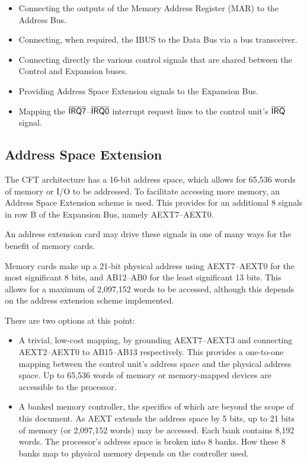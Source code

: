 \documentclass[11pt,a4paper,twocolumns]{article}
\newcommand{\ns}[1]{$\overline{\mbox{\textsf{{#1}}}}$}
\newcommand{\ps}[1]{\textsf{#1}}
\newcommand\bus[1]{{#1}}
\newcommand\IBUS{\bus{IBUS}}
\newcommand\register[1]{\textsf{#1}}
\newcommand\MAR{\register{MAR}}
\newcommand\IRQ{\ns{IRQ}}
\newcommand\IRQn[1]{\ns{IRQ{#1}}}
\newcommand\ABUSn[1]{\ps{AB#1}}
\newcommand\AEXTn[1]{\ps{AEXT#1}}
\begin{document}
\begin{itemize}
\item Connecting the outputs of the Memory Address Register (\MAR) to the Address Bus.
\item Connecting, when required, the \IBUS{} to the Data Bus via a bus transceiver.
\item Connecting directly the various control signals that are shared
  between the Control and Expansion buses.
\item Providing Address Space Extension signals to the Expansion Bus.
\item Mapping the \IRQn{7}–\IRQn{0} interrupt request lines to the
  control unit's \IRQ{} signal.
\end{itemize}

\subsection{Address Space Extension}

The CFT architecture has a 16-bit address space, which allows for
65,536 words of memory or I/O to be addressed. To facilitate accessing
more memory, an Address Space Extension scheme is used. This provides
for an additional 8 signals in row B of the Expansion Bus, namely
\AEXTn{7}–\AEXTn{0}.

An address extension card may drive these signals in one of many ways
for the benefit of memory cards.

Memory cards make up a 21-bit physical address using
\AEXTn{7}–\AEXTn{0} for the most significant 8 bits, and
\ABUSn{12}–\ABUSn{0} for the least significant 13 bits. This allows
for a maximum of 2,097,152 words to be accessed, although this depends
on the address extension scheme implemented.

There are two options at this point:

\begin{itemize}
\item A trivial, low-cost mapping, by grounding \AEXTn{7}–\AEXTn{3}
  and connecting \AEXTn{2}–\AEXTn{0} to \ABUSn{15}–\ABUSn{13}
  respectively. This provides a one-to-one mapping between the control
  unit's address space and the physical address space. Up to 65,536
  words of memory or memory-mapped devices are accessible to the
  processor.
\item A banked memory controller, the specifics of which are beyond
  the scope of this document. As \AEXTn{} extends the address space by
  5 bits, up to 21 bits of memory (or 2,097,152 words) may be
  accessed. Each bank contains 8,192 words. The processor's address
  space is broken into 8 banks. How these 8 banks map to physical
  memory depends on the controller used.
\end{itemize}
\end{document}
